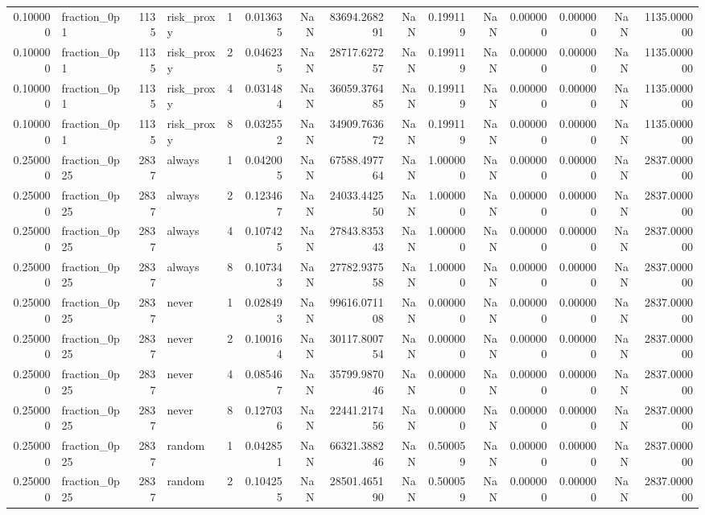 \begin{tabular}{rlrlrrrrrrrrrrr}
0.100000 & fraction\_0p1 & 1135 & risk\_proxy & 1 & 0.013635 & NaN & 83694.268291 & NaN & 0.199119 & NaN & 0.000000 & 0.000000 & NaN & 1135.000000 \\
0.100000 & fraction\_0p1 & 1135 & risk\_proxy & 2 & 0.046235 & NaN & 28717.627257 & NaN & 0.199119 & NaN & 0.000000 & 0.000000 & NaN & 1135.000000 \\
0.100000 & fraction\_0p1 & 1135 & risk\_proxy & 4 & 0.031484 & NaN & 36059.376485 & NaN & 0.199119 & NaN & 0.000000 & 0.000000 & NaN & 1135.000000 \\
0.100000 & fraction\_0p1 & 1135 & risk\_proxy & 8 & 0.032552 & NaN & 34909.763672 & NaN & 0.199119 & NaN & 0.000000 & 0.000000 & NaN & 1135.000000 \\
0.250000 & fraction\_0p25 & 2837 & always & 1 & 0.042005 & NaN & 67588.497764 & NaN & 1.000000 & NaN & 0.000000 & 0.000000 & NaN & 2837.000000 \\
0.250000 & fraction\_0p25 & 2837 & always & 2 & 0.123467 & NaN & 24033.442550 & NaN & 1.000000 & NaN & 0.000000 & 0.000000 & NaN & 2837.000000 \\
0.250000 & fraction\_0p25 & 2837 & always & 4 & 0.107425 & NaN & 27843.835343 & NaN & 1.000000 & NaN & 0.000000 & 0.000000 & NaN & 2837.000000 \\
0.250000 & fraction\_0p25 & 2837 & always & 8 & 0.107343 & NaN & 27782.937558 & NaN & 1.000000 & NaN & 0.000000 & 0.000000 & NaN & 2837.000000 \\
0.250000 & fraction\_0p25 & 2837 & never & 1 & 0.028493 & NaN & 99616.071108 & NaN & 0.000000 & NaN & 0.000000 & 0.000000 & NaN & 2837.000000 \\
0.250000 & fraction\_0p25 & 2837 & never & 2 & 0.100164 & NaN & 30117.800754 & NaN & 0.000000 & NaN & 0.000000 & 0.000000 & NaN & 2837.000000 \\
0.250000 & fraction\_0p25 & 2837 & never & 4 & 0.085467 & NaN & 35799.987046 & NaN & 0.000000 & NaN & 0.000000 & 0.000000 & NaN & 2837.000000 \\
0.250000 & fraction\_0p25 & 2837 & never & 8 & 0.127036 & NaN & 22441.217456 & NaN & 0.000000 & NaN & 0.000000 & 0.000000 & NaN & 2837.000000 \\
0.250000 & fraction\_0p25 & 2837 & random & 1 & 0.042851 & NaN & 66321.388246 & NaN & 0.500059 & NaN & 0.000000 & 0.000000 & NaN & 2837.000000 \\
0.250000 & fraction\_0p25 & 2837 & random & 2 & 0.104255 & NaN & 28501.465190 & NaN & 0.500059 & NaN & 0.000000 & 0.000000 & NaN & 2837.000000 \\

\end{tabular}
